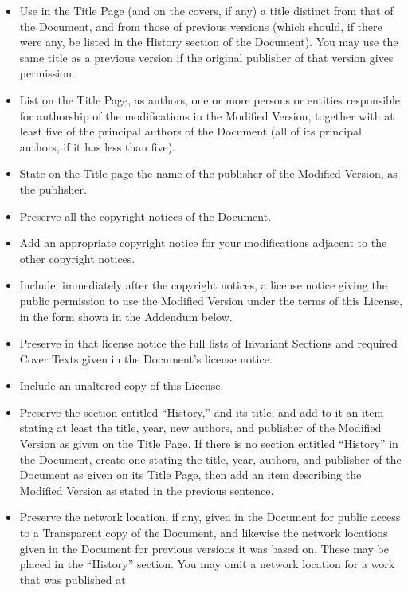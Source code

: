 \documentclass{doc}
\begin{document}
\begin{itemize}

\item Use in the Title Page (and on the covers, if any) a title distinct
   from that of the Document, and from those of previous versions
   (which should, if there were any, be listed in the History section
   of the Document).  You may use the same title as a previous version
   if the original publisher of that version gives permission.
\item List on the Title Page, as authors, one or more persons or entities
   responsible for authorship of the modifications in the Modified
   Version, together with at least five of the principal authors of the
   Document (all of its principal authors, if it has less than five).
\item State on the Title page the name of the publisher of the
   Modified Version, as the publisher.
\item Preserve all the copyright notices of the Document.
\item Add an appropriate copyright notice for your modifications
   adjacent to the other copyright notices.
\item Include, immediately after the copyright notices, a license notice
   giving the public permission to use the Modified Version under the
   terms of this License, in the form shown in the Addendum below.
\item Preserve in that license notice the full lists of Invariant Sections
   and required Cover Texts given in the Document's license notice.
\item Include an unaltered copy of this License.
\item Preserve the section entitled ``History,'' and its title, and add to
   it an item stating at least the title, year, new authors, and
   publisher of the Modified Version as given on the Title Page.  If
   there is no section entitled ``History'' in the Document, create one
   stating the title, year, authors, and publisher of the Document as
   given on its Title Page, then add an item describing the Modified
   Version as stated in the previous sentence.
\item Preserve the network location, if any, given in the Document for
   public access to a Transparent copy of the Document, and likewise
   the network locations given in the Document for previous versions
   it was based on.  These may be placed in the ``History'' section.
   You may omit a network location for a work that was published at

\end{itemize}
\end{document}
